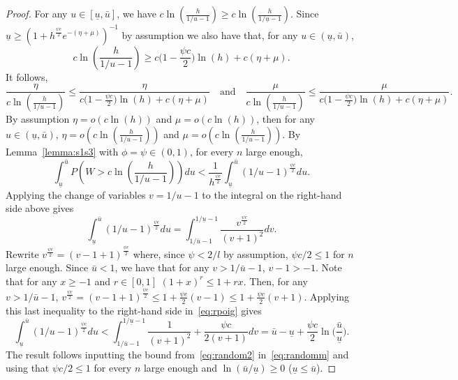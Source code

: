 \documentclass[
  12pt]{article}
\begin{document}
\begin{proof}
For any $u\in [\underline{u},\bar{u}]$, we have $c\ln \left(\frac{h}{1 / u-1}\right) \geq c\ln \left(\frac{h}{1 / \underline{u}-1}\right)$. Since $\underline{u}\geq (1+h^{\frac{\psi c}{2}}e^{-(\eta+\mu)})^{-1}$ by assumption  we also have that, for any $u\in (\underline{u},\bar{u})$,
$$c\ln \left(\frac{h}{1 / u-1}\right) \geq c\big(1-\frac{\psi c}{2}\big)\ln(h)+c(\eta+\mu).$$
It follows,
$$\frac{\eta}{c\ln \left(\frac{h}{1 / u-1}\right)}\leq \frac{\eta}{c\big(1-\frac{\psi c}{2}\big)\ln(h)+c(\eta+\mu)}
\quad\text{and}\quad
\frac{\mu}{c\ln \left(\frac{h}{1 / u-1}\right)}\leq\frac{\mu}{ c\big(1-\frac{\psi c}{2}\big)\ln(h)+c(\eta+\mu)}.$$
By assumption $\eta=o\left(c\ln (h)\right)$ and $\mu=o\left(c\ln (h)\right)$, then for any $u\in (\underline{u},\bar{u})$, $\eta=o\left(c\ln \left(\frac{h}{1 / u-1}\right)\right)$ and $\mu=o\left(c\ln \left(\frac{h}{1 / u-1}\right)\right)$. By Lemma~\ref{lemma:s1s3} with $\phi=\psi\in(0,1)$, for every $n$ large enough,
\begin{equation}\label{eq:randomm}
    \int_{\underline{u}}^{\bar{u}} P\left(W>c\ln \left(\frac{h}{1 / u-1}\right)\right) d u< \frac{1}{h^{\frac{\psi c}{2}}} \int_{\underline{u}}^{\bar{u}}(1 / u-1)^{\frac{\psi c}{2}} d u .
\end{equation}
Applying the change of variables $v=1 / u-1$ to the integral on the right-hand side above gives
\begin{equation}\label{eq:rpoig}
    \int_{\underline{u}}^{\bar{u}}(1 / u-1)^{\frac{\psi c}{2}} d u=\int_{1 / \bar{u}-1}^{1 / \underline{u}-1} \frac{v^{\frac{\psi c}{2}}}{(v+1)^2} d v.
\end{equation}
Rewrite $v^{\frac{\psi c}{2}}=(v-1 + 1)^{\frac{\psi c}{2}}$ where, since $\psi<2/l$ by assumption, $\psi c/2\leq1$ for $n$ large enough. Since $\bar{u}<1$, we have that for any $v>1 / \bar{u}-1$, $v-1>-1$. Note that for any $x \geq-1$ and $r\in[0,1]$ $(1+x)^r \leq 1+r x$. Then, for any $v>1 / \bar{u}-1$, $v^{\frac{\psi c}{2}}=(v-1 + 1)^{\frac{\psi c}{2}}\leq 1 + \frac{\psi c}{2} (v-1)\leq 1 + \frac{\psi c}{2}(v+1)$. Applying this last inequality to the right-hand side in~\eqref{eq:rpoig} gives
\begin{equation}\label{eq:random2}
\int_{\underline{u}}^{\bar{u}}(1 / u-1)^{\frac{\psi c}{2}} d u<\int_{1 / \bar{u}-1}^{1 / \underline{u}-1} \frac{1}{(v+1)^2} +\frac{\psi c}{2(v+1)} d v = \bar{u}-\underline{u}+\frac{\psi c}{2}\ln\Big(\frac{\bar{u}}{\underline{u}}\Big).
\end{equation}
The result follows inputting the bound from~\eqref{eq:random2} in~\eqref{eq:randomm} and using that $\psi c/2\leq1$ for every $n$ large enough and $\ln(\bar{u}/\underline{u}) \geq 0$ ($\underline{u} \leq \bar{u}$).
\end{proof}
\end{document}
